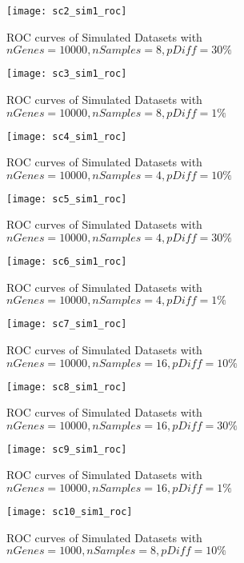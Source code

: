 \begin{figure}[h!tb] 
\texttt{[image: sc2\_sim1\_roc]}
\caption{ROC curves of Simulated Datasets with $nGenes=10000, nSamples=8, pDiff=30\%$}
\label{sc2_roc}
\end{figure}

\begin{figure}[h!tb] 
\texttt{[image: sc3\_sim1\_roc]}
\caption{ROC curves of Simulated Datasets with $nGenes=10000, nSamples=8, pDiff=1\%$}
\label{sc3_roc}
\end{figure}


\begin{figure}[h!tb] 
\texttt{[image: sc4\_sim1\_roc]}
\caption{ROC curves of Simulated Datasets with $nGenes=10000, nSamples=4, pDiff=10\%$}
\label{sc4_roc}
\end{figure}


\begin{figure}[h!tb] 
\texttt{[image: sc5\_sim1\_roc]}
\caption{ROC curves of Simulated Datasets with $nGenes=10000, nSamples=4, pDiff=30\%$}
\label{sc5_roc}
\end{figure}


\begin{figure}[h!tb] 
\texttt{[image: sc6\_sim1\_roc]}
\caption{ROC curves of Simulated Datasets with $nGenes=10000, nSamples=4, pDiff=1\%$}
\label{sc6_roc}
\end{figure}

\begin{figure}[h!tb] 
\texttt{[image: sc7\_sim1\_roc]}
\caption{ROC curves of Simulated Datasets with $nGenes=10000, nSamples=16, pDiff=10\%$}
\label{sc7_roc}
\end{figure}

\begin{figure}[h!tb] 
\texttt{[image: sc8\_sim1\_roc]}
\caption{ROC curves of Simulated Datasets with $nGenes=10000, nSamples=16, pDiff=30\%$}
\label{sc8_roc}
\end{figure}

\begin{figure}[h!tb] 
\texttt{[image: sc9\_sim1\_roc]}
\caption{ROC curves of Simulated Datasets with $nGenes=10000, nSamples=16, pDiff=1\%$}
\label{sc9_roc}
\end{figure}


\begin{figure}[h!tb] 
\texttt{[image: sc10\_sim1\_roc]}
\caption{ROC curves of Simulated Datasets with $nGenes=1000, nSamples=8, pDiff=10\%$}
\label{sc10_roc_01}
\end{figure}




